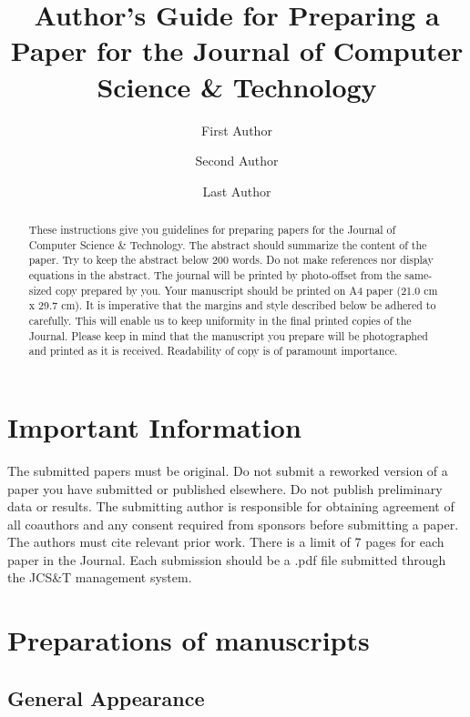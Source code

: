 \documentclass{jcst}
\title{Author's Guide for Preparing a Paper for the Journal of Computer Science \& Technology}
\author[1,2]{First Author}
\author[2]{Second Author}
\author[1]{Last Author}
\affil[1]{University Department, University Name City, State ZIP/Zone, Country \authorcr
\{firstauthor, lastauthor\}@mail.dom }
\affil[2]{Another University Department, University Name City, State ZIP/Zone, Country \authorcr
\{secondauthor\}@mail.dom}
\begin{document}
\maketitle

\begin{abstract}
These instructions give you guidelines for preparing papers for the
Journal of Computer Science \& Technology. The abstract should summarize the
 content of the paper. Try to keep the abstract below 200 words. Do not make
  references nor display equations in the abstract. The journal will be printed
  by photo-offset from the same-sized copy prepared by you. Your manuscript
   should be printed on A4 paper (21.0 cm x 29.7 cm). It is imperative that the
 margins and style described below be adhered to carefully. This will enable
 us to keep uniformity in the final printed copies of the Journal. Please
 keep in mind that the manuscript you prepare will be photographed and
 printed as it is received. Readability of copy is of paramount importance.
\end{abstract}



\section{Important Information}

The submitted papers must be original. Do not submit a reworked version of a paper you
have submitted or published elsewhere. Do not publish preliminary data or results.
The submitting author is responsible for obtaining agreement of all coauthors and
any consent required from sponsors before submitting a paper. The authors must
 cite relevant prior work.
There is a limit of 7 pages for each paper in the Journal. Each submission should
be a .pdf file submitted through the JCS\&T management system.

\section{Preparations of manuscripts}

\subsection{General Appearance}
\end{document}

